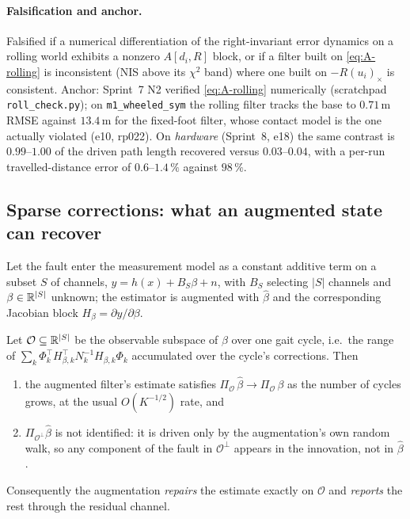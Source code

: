 \paragraph{Falsification and anchor.}
Falsified if a numerical differentiation of the right-invariant error dynamics
on a rolling world exhibits a nonzero $A[d_i, R]$ block, or if a filter built
on \eqref{eq:A-rolling} is inconsistent (NIS above its $\chi^2$ band) where one
built on $-R(u_i)_\times$ is consistent. Anchor: Sprint~7 N2 verified
\eqref{eq:A-rolling} numerically (scratchpad \texttt{roll\_check.py}); on
\texttt{m1\_wheeled\_sym} the rolling filter tracks the base to $0.71$\,m RMSE
against $13.4$\,m for the fixed-foot filter, whose contact model is the one
actually violated (e10, rp022). On \emph{hardware} (Sprint~8, e18) the same
contrast is $0.99$--$1.00$ of the driven path length recovered versus
$0.03$--$0.04$, with a per-run travelled-distance error of $0.6$--$1.4\,\%$
against $98\,\%$.

\subsection{Sparse corrections: what an augmented state can recover}
\label{sec:n2-sparse}

Let the fault enter the measurement model as a constant additive term on a
subset $S$ of channels,
$y = h(x) + B_S \beta + n$, with $B_S$ selecting $|S|$ channels and
$\beta \in \mathbb{R}^{|S|}$ unknown; the estimator is augmented with $\hat\beta$ and
the corresponding Jacobian block $H_\beta = \partial y/\partial\beta$.

\begin{proposition}
\label{prop:sparse-consistency}
Let $\mathcal{O} \subseteq \mathbb{R}^{|S|}$ be the observable subspace of $\beta$ over
one gait cycle, i.e.\ the range of $\sum_k \Phi_k^\top H_{\beta,k}^\top
N_k^{-1} H_{\beta,k}\Phi_k$ accumulated over the cycle's corrections. Then
\begin{enumerate}
\item[(i)] the augmented filter's estimate satisfies
  $\Pi_{\mathcal{O}}\,\hat\beta \to \Pi_{\mathcal{O}}\,\beta$ as the number of
  cycles grows, at the usual $O(K^{-1/2})$ rate, and
\item[(ii)] $\Pi_{\mathcal{O}^\perp}\hat\beta$ is not identified: it is driven
  only by the augmentation's own random walk, so any component of the fault in
  $\mathcal{O}^\perp$ appears in the innovation, not in $\hat\beta$.
\end{enumerate}
Consequently the augmentation \emph{repairs} the estimate exactly on
$\mathcal{O}$ and \emph{reports} the rest through the residual channel.
\end{proposition}

